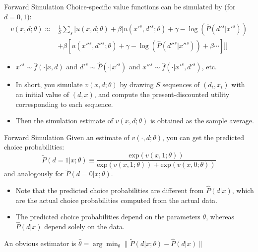 \documentclass[aspectratio=169,11pt]{beamer}
\begin{document}
\begin{frame}{Forward Simulation}
Choice-specific value functions can be simulated by (for $d=0,1$):
\begin{align*}
v (x, d; \theta) \approx & \frac 1 S \sum_s [ u(x, d;\theta) + \beta [ u(x'^s, d'^s;\theta) + \gamma - \log(\hat P(d'^s|x'^s)) \\
& +\beta [ u(x''^s, d''^s;\theta) + \gamma - \log (\hat P (d''^s |x''^s)) + \beta \cdots ]]]
\end{align*}
\vspace{-.4cm}
\begin{itemize}
\item $x'^s \sim \hat f(\cdot | x, d)$ and  $d'^s \sim \hat P(\cdot | x'^s)$ and $x''^s \sim \hat f(\cdot | x'^s, d'^s)$, etc.
\item In short, you simulate $v (x, d;\theta)$ by drawing $S$ \alert{sequences} of $(d_t, x_t)$ with an initial value of $(d, x)$, and compute the present-discounted utility corresponding to each sequence.
\item Then the simulation estimate of $v (x, d;\theta)$ is obtained as the sample average.
\end{itemize}
\end{frame}


\begin{frame}{Forward Simulation}
Given an estimate of $v (\cdot, d; \theta)$, you can get the \alert{predicted choice probabilities}:
\begin{equation}
\tilde P (d =1 |x ; \theta) \equiv \frac {\text{exp} \left ( v (x, 1; \theta) \right )}{\text{exp} \left ( v (x, 1 ;\theta) \right ) + \text{exp} \left ( v (x, 0 ;\theta ) \right )}
\end{equation}
and analogously for $\tilde P (d = 0 |x ; \theta)$.
\begin{itemize}
\item Note that the predicted choice probabilities are different from $\hat P (d|x)$, which are the \alert{actual choice probabilities} computed from the actual data.
\item The predicted choice probabilities depend on the parameters $\theta$, whereas $\hat P (d|x)$ depend solely on the data.
\end{itemize}
\medskip
An obvious estimator is $\hat\theta = \arg \min_{\theta} \|  \tilde{P} (d |x ; \theta) -\hat{P} (d |x) \|$
\end{frame}
\end{document}
